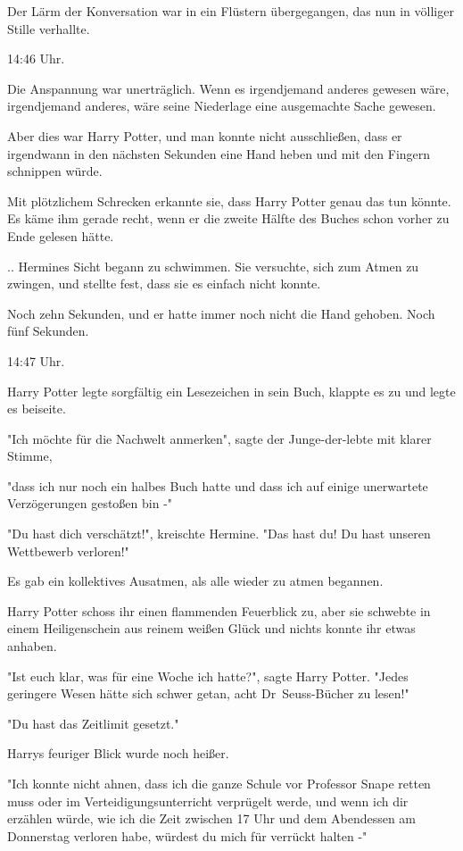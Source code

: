{Der Lärm der Konversation war in ein Flüstern übergegangen, das nun in völliger Stille verhallte.

14:46 Uhr.

Die Anspannung war unerträglich. Wenn es irgendjemand anderes gewesen wäre, irgendjemand anderes, wäre seine Niederlage eine ausgemachte Sache gewesen.

Aber dies war Harry Potter, und man konnte nicht ausschließen, dass er irgendwann in den nächsten Sekunden eine Hand heben und mit den Fingern schnippen würde.

Mit plötzlichem Schrecken erkannte sie, dass Harry Potter genau das tun könnte. Es käme ihm gerade recht, wenn er die zweite Hälfte des Buches schon vorher zu Ende gelesen hätte.

.. Hermines Sicht begann zu schwimmen. Sie versuchte, sich zum Atmen zu zwingen, und stellte fest, dass sie es einfach nicht konnte.

Noch zehn Sekunden, und er hatte immer noch nicht die Hand gehoben. Noch fünf Sekunden.

14:47 Uhr.

Harry Potter legte sorgfältig ein Lesezeichen in sein Buch, klappte es zu und legte es beiseite.

"Ich möchte für die Nachwelt anmerken", sagte der Junge-der-lebte mit klarer Stimme,

"dass ich nur noch ein halbes Buch hatte und dass ich auf einige unerwartete Verzögerungen gestoßen bin -"

"Du hast dich verschätzt!", kreischte Hermine. "Das hast du! Du hast unseren Wettbewerb verloren!"

Es gab ein kollektives Ausatmen, als alle wieder zu atmen begannen.

Harry Potter schoss ihr einen flammenden Feuerblick zu, aber sie schwebte in einem Heiligenschein aus reinem weißen Glück und nichts konnte ihr etwas anhaben.

"Ist euch klar, was für eine Woche ich hatte?", sagte Harry Potter. "Jedes geringere Wesen hätte sich schwer getan, acht Dr~Seuss-Bücher zu lesen!"

"Du hast das Zeitlimit gesetzt."

Harrys feuriger Blick wurde noch heißer.

"Ich konnte nicht ahnen, dass ich die ganze Schule vor Professor Snape retten muss oder im Verteidigungsunterricht verprügelt werde, und wenn ich dir erzählen würde, wie ich die Zeit zwischen 17 Uhr und dem Abendessen am Donnerstag verloren habe, würdest du mich für verrückt halten -"

}
